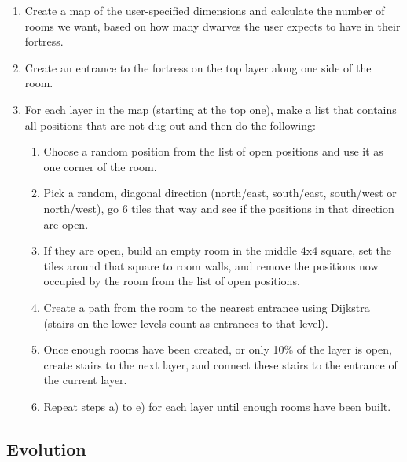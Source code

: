 \begin{enumerate}

	\item Create a map of the user-specified dimensions and calculate the number of rooms we want, based on how many dwarves the user expects to have in their fortress.

	\item Create an entrance to the fortress on the top layer along one side of the room.

	\item For each layer in the map (starting at the top one), make a list that contains all positions that are not dug out and then do the following:

	\begin{enumerate}
		
		\item Choose a random position from the list of open positions and use it as one corner of the room.

		\item Pick a random, diagonal direction (north/east, south/east, south/west or north/west), go 6 tiles that way and see if the positions in that direction are open.

		\item If they are open, build an empty room in the middle 4x4 square, set the tiles around that square to room walls, and remove the positions now occupied by the room from the list of open positions.

		\item Create a path from the room to the nearest entrance using Dijkstra (stairs on the lower levels count as entrances to that level).

		\item Once enough rooms have been created, or only 10\% of the layer is open, create stairs to the next layer, and connect these stairs to the entrance of the current layer.

		\item Repeat steps a) to e) for each layer until enough rooms have been built.

	\end{enumerate}

\end{enumerate}

\subsection{Evolution}
\label{04_Evolution}

